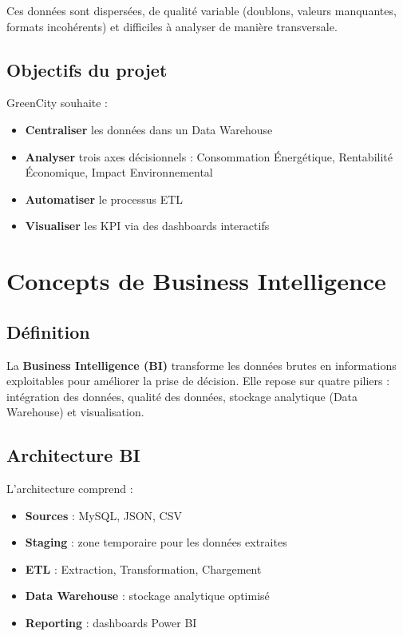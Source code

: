 \documentclass[12pt,a4paper]{report}
\begin{document}
Ces données sont dispersées, de qualité variable (doublons, valeurs manquantes, formats incohérents) et difficiles à analyser de manière transversale.

\subsection{Objectifs du projet}

GreenCity souhaite :
\begin{itemize}
    \item \textbf{Centraliser} les données dans un Data Warehouse
    \item \textbf{Analyser} trois axes décisionnels : Consommation Énergétique, Rentabilité Économique, Impact Environnemental
    \item \textbf{Automatiser} le processus ETL
    \item \textbf{Visualiser} les KPI via des dashboards interactifs
\end{itemize}

\section{Concepts de Business Intelligence}

\subsection{Définition}

La \textbf{Business Intelligence (BI)} transforme les données brutes en informations exploitables pour améliorer la prise de décision. Elle repose sur quatre piliers : intégration des données, qualité des données, stockage analytique (Data Warehouse) et visualisation.

\subsection{Architecture BI}

L'architecture comprend :
\begin{itemize}
    \item \textbf{Sources} : MySQL, JSON, CSV
    \item \textbf{Staging} : zone temporaire pour les données extraites
    \item \textbf{ETL} : Extraction, Transformation, Chargement
    \item \textbf{Data Warehouse} : stockage analytique optimisé
    \item \textbf{Reporting} : dashboards Power BI
\end{itemize}
\end{document}
